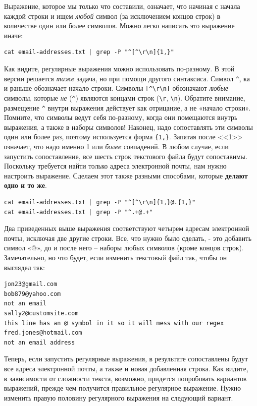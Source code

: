 \documentclass[12pt]{article}
\begin{document}
Выражение, которое мы только что составили, означает, что начиная с
начала каждой строки и ищем \emph{любой} символ (за исключением концов
строк) в количестве один или более символов. Можно легко написать это
выражение иначе:

\begin{verbatim}
cat email-addresses.txt | grep -P "^[^\r\n]{1,}"
\end{verbatim}

Как видите, регулярные выражения можно использовать по-разному. В этой
версии решается \emph{таже} задача, но при помощи другого синтаксиса.
Символ \texttt{\^{}}, ка и раньше обозначает начало строки. Символы
\texttt{{[}\^{}\textbackslash{}r\textbackslash{}n{]}} обозначают
\emph{любые} символы, которые \emph{не} (\texttt{\^{}}) являются концами
строк (\texttt{\textbackslash{}r}, \texttt{\textbackslash{}n}). Обратите
внимание, размещение \texttt{\^{}} внутри выражения действует как
отрицание, а не «начало строки». Помните, что символы ведут себя
по-разному, когда они помещаются внутрь выражения, а также в наборы
символов! Наконец, надо сопоставлять эти символы один или более раз,
поэтому используется форма \texttt{\{1,\}}. Запятая после <<1>> означает,
что надо именно 1 или \emph{более} совпадений. В любом случае, если
запустить сопоставление, все шесть строк текстового файла будут
сопоставимы. Поскольку требуется найти только адреса электронной почты,
нам нужно настроить выражение. Сделаем этот также разными способами,
которые \textbf{делают одно и то же}.

\begin{verbatim}
cat email-addresses.txt | grep -P "^[^\r\n]{1,}@.{1,}"
cat email-addresses.txt | grep -P "^.+@.+"
\end{verbatim}

Два приведенных выше выражения соответствуют четырем адресам электронной
почты, исключая две другие строки. Все, что нужно было сделать, - это
добавить символ «@», до и после него -- наборы любых символов (кроме
концов строк). Замечательно, но что будет, если изменить текстовый файл
так, чтобы он выглядел так:

\begin{verbatim}
jon23@gmail.com
bob879@yahoo.com
not an email
sally2@customsite.com
this line has an @ symbol in it so it will mess with our regex
fred.jones@hotmail.com
not an email address
\end{verbatim}

Теперь, если запустить регулярные выражения, в результате сопоставлены
будут все адреса электронной почты, а также и новая добавленная строка.
Как видите, в зависимости от сложности текста, возможно, придется
попробовать вариантов выражений, прежде чем получится правильное
регулярное выражение. Нужно изменить правую половину регулярного
выражения на следующий вариант.
\end{document}
